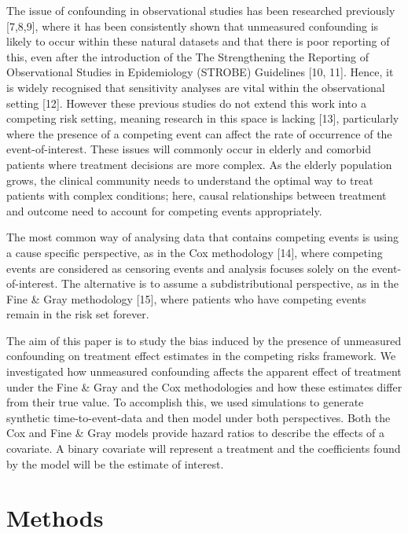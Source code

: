 \documentclass[12pt,PhD,twoside,openright]{muthesis}
\begin{document}
The issue of confounding in observational studies has been researched previously {[}7,8,9{]}, where it has been consistently shown that unmeasured confounding is likely to occur within these natural datasets and that there is poor reporting of this, even after the introduction of the The Strengthening the Reporting of Observational Studies in Epidemiology (STROBE) Guidelines {[}10, 11{]}. Hence, it is widely recognised that sensitivity analyses are vital within the observational setting {[}12{]}. However these previous studies do not extend this work into a competing risk setting, meaning research in this space is lacking {[}13{]}, particularly where the presence of a competing event can affect the rate of occurrence of the event-of-interest. These issues will commonly occur in elderly and comorbid patients where treatment decisions are more complex. As the elderly population grows, the clinical community needs to understand the optimal way to treat patients with complex conditions; here, causal relationships between treatment and outcome need to account for competing events appropriately.

The most common way of analysing data that contains competing events is using a cause specific perspective, as in the Cox methodology {[}14{]}, where competing events are considered as censoring events and analysis focuses solely on the event-of-interest. The alternative is to assume a subdistributional perspective, as in the Fine \& Gray methodology {[}15{]}, where patients who have competing events remain in the risk set forever.

The aim of this paper is to study the bias induced by the presence of unmeasured confounding on treatment effect estimates in the competing risks framework. We investigated how unmeasured confounding affects the apparent effect of treatment under the Fine \& Gray and the Cox methodologies and how these estimates differ from their true value. To accomplish this, we used simulations to generate synthetic time-to-event-data and then model under both perspectives. Both the Cox and Fine \& Gray models provide hazard ratios to describe the effects of a covariate. A binary covariate will represent a treatment and the coefficients found by the model will be the estimate of interest.

\hypertarget{methods-2}{%
\section{Methods}\label{methods-2}}
\end{document}
